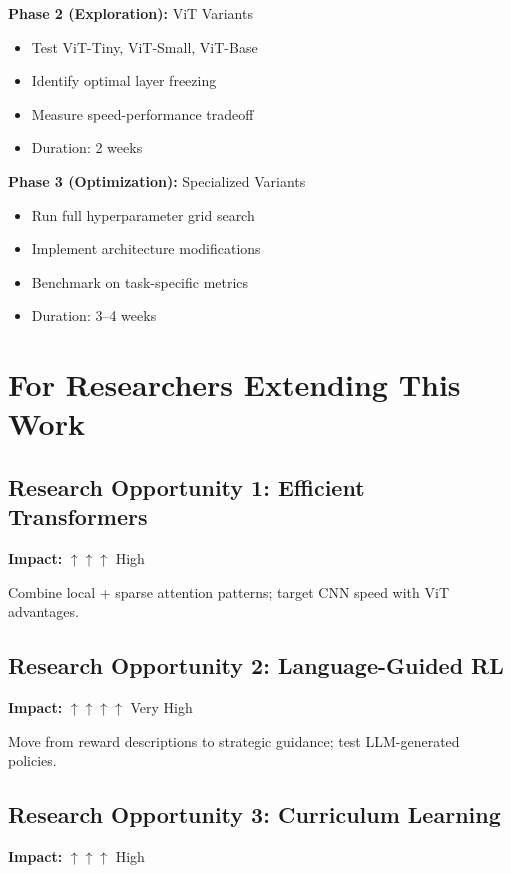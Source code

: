 \documentclass[12pt,a4paper,openany]{report}
\begin{document}
\textbf{Phase 2 (Exploration):} ViT Variants
\begin{itemize}
    \item Test ViT-Tiny, ViT-Small, ViT-Base
    \item Identify optimal layer freezing
    \item Measure speed-performance tradeoff
    \item Duration: 2 weeks
\end{itemize}

\textbf{Phase 3 (Optimization):} Specialized Variants
\begin{itemize}
    \item Run full hyperparameter grid search
    \item Implement architecture modifications
    \item Benchmark on task-specific metrics
    \item Duration: 3--4 weeks
\end{itemize}

\section{For Researchers Extending This Work}

\subsection{Research Opportunity 1: Efficient Transformers}

\textbf{Impact:} $\uparrow\uparrow\uparrow$ High

Combine local + sparse attention patterns; target CNN speed with ViT advantages.

\subsection{Research Opportunity 2: Language-Guided RL}

\textbf{Impact:} $\uparrow\uparrow\uparrow\uparrow$ Very High

Move from reward descriptions to strategic guidance; test LLM-generated policies.

\subsection{Research Opportunity 3: Curriculum Learning}

\textbf{Impact:} $\uparrow\uparrow\uparrow$ High
\end{document}
